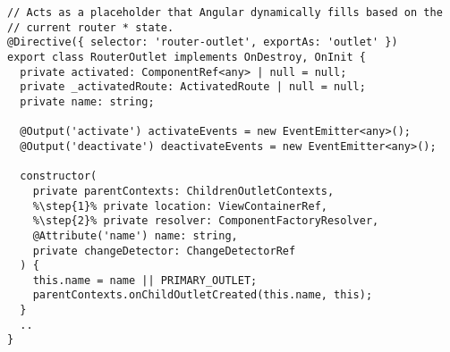 \begin{verbatim}
// Acts as a placeholder that Angular dynamically fills based on the
// current router * state.
@Directive({ selector: 'router-outlet', exportAs: 'outlet' })
export class RouterOutlet implements OnDestroy, OnInit {
  private activated: ComponentRef<any> | null = null;
  private _activatedRoute: ActivatedRoute | null = null;
  private name: string;

  @Output('activate') activateEvents = new EventEmitter<any>();
  @Output('deactivate') deactivateEvents = new EventEmitter<any>();

  constructor(
    private parentContexts: ChildrenOutletContexts,
    %\step{1}% private location: ViewContainerRef,
    %\step{2}% private resolver: ComponentFactoryResolver,
    @Attribute('name') name: string,
    private changeDetector: ChangeDetectorRef
  ) {
    this.name = name || PRIMARY_OUTLET;
    parentContexts.onChildOutletCreated(this.name, this);
  }
  ..
}
\end{verbatim}
